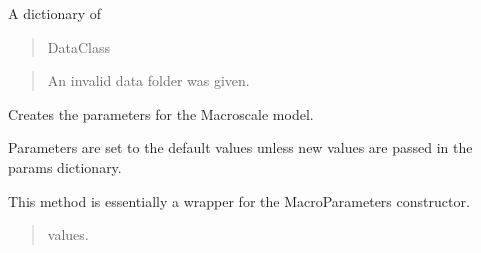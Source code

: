 \documentclass[letterpaper,10pt,english]{sphinxmanual}
\begin{document}
\begin{fulllineitems}
\begin{fulllineitems}
\label{\detokenize{lysis.util:lysis.util.parameters.Experiment.macro_params}}
\pysigstartsignatures
{}
\pysigstopsignatures
\sphinxAtStartPar
A dictionary of
\begin{quote}\begin{description}
\sphinxAtStartPar
DataClass

\end{description}\end{quote}

\end{fulllineitems}

\begin{quote}\begin{description}
\sphinxAtStartPar
{} \textendash{} An invalid data folder was given.

\end{description}\end{quote}

\begin{fulllineitems}
\label{\detokenize{lysis.util:lysis.util.parameters.Experiment.initialize_macro_param}}
\pysigstartsignatures
{}
\pysigstopsignatures
\sphinxAtStartPar
Creates the parameters for the Macroscale model.

\sphinxAtStartPar
Parameters are set to the default values unless new values are passed
in the params dictionary.

\sphinxAtStartPar
This method is essentially a wrapper for the MacroParameters
constructor.
\begin{quote}\begin{description}
\sphinxAtStartPar
{} \textendash{} \begin{description}
\sphinxAtStartPar
values.


\end{description}
\end{description}
\end{quote}
\end{fulllineitems}
\end{fulllineitems}
\end{document}
